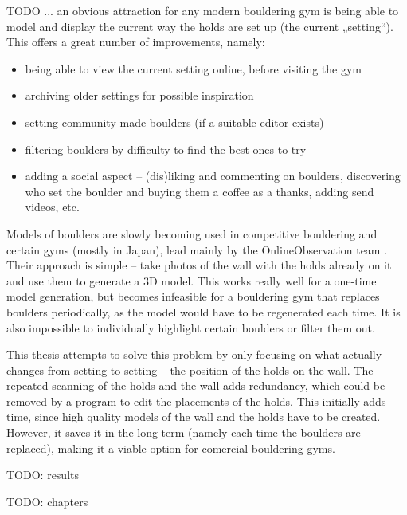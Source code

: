 

TODO ... an obvious attraction for any modern bouldering gym is being able to model and display the current way the holds are set up (the current „setting“). This offers a great number of improvements, namely:

\begin{itemize}
\item being able to view the current setting online, before visiting the gym
\item archiving older settings for possible inspiration
\item setting community-made boulders (if a suitable editor exists)
\item filtering boulders by difficulty to find the best ones to try
\item adding a social aspect -- (dis)liking and commenting on boulders, discovering who set the boulder and buying them a coffee as a thanks, adding send videos, etc.
\end{itemize}

Models of boulders are slowly becoming used in competitive bouldering and certain gyms (mostly in Japan), lead mainly by the OnlineObservation team \cite{onlineobservation}. Their approach is simple -- take photos of the wall with the holds already on it and use them to generate a 3D model. This works really well for a one-time model generation, but becomes infeasible for a bouldering gym that replaces boulders periodically, as the model would have to be regenerated each time. It is also impossible to individually highlight certain boulders or filter them out.

This thesis attempts to solve this problem by only focusing on what actually changes from setting to setting -- the position of the holds on the wall. The repeated scanning of the holds and the wall adds redundancy, which could be removed by a program to edit the placements of the holds. This initially adds time, since high quality models of the wall and the holds have to be created. However, it saves it in the long term (namely each time the boulders are replaced), making it a viable option for comercial bouldering gyms.

TODO: results

TODO: chapters

